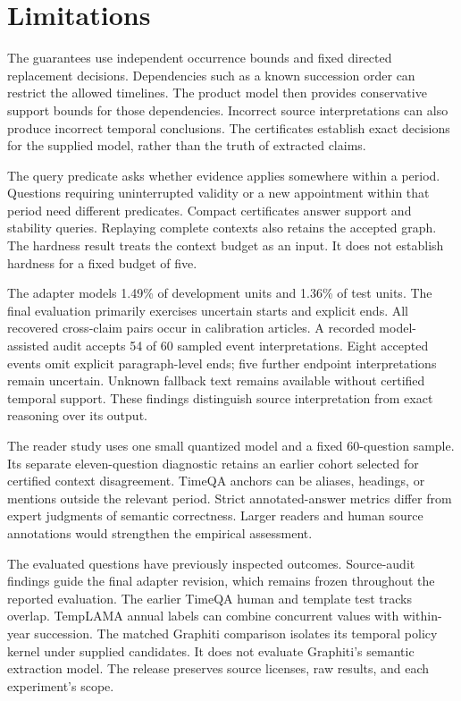 \section*{Limitations}
The guarantees use independent occurrence bounds and fixed directed replacement decisions.
Dependencies such as a known succession order can restrict the allowed timelines.
The product model then provides conservative support bounds for those dependencies.
Incorrect source interpretations can also produce incorrect temporal conclusions.
The certificates establish exact decisions for the supplied model, rather than the truth of extracted claims.

The query predicate asks whether evidence applies somewhere within a period.
Questions requiring uninterrupted validity or a new appointment within that period need different predicates.
Compact certificates answer support and stability queries.
Replaying complete contexts also retains the accepted graph.
The hardness result treats the context budget as an input.
It does not establish hardness for a fixed budget of five.

The adapter models 1.49\% of development units and 1.36\% of test units.
The final evaluation primarily exercises uncertain starts and explicit ends.
All recovered cross-claim pairs occur in calibration articles.
A recorded model-assisted audit accepts 54 of 60 sampled event interpretations.
Eight accepted events omit explicit paragraph-level ends; five further endpoint interpretations remain uncertain.
Unknown fallback text remains available without certified temporal support.
These findings distinguish source interpretation from exact reasoning over its output.

The reader study uses one small quantized model and a fixed 60-question sample.
Its separate eleven-question diagnostic retains an earlier cohort selected for certified context disagreement.
TimeQA anchors can be aliases, headings, or mentions outside the relevant period.
Strict annotated-answer metrics differ from expert judgments of semantic correctness.
Larger readers and human source annotations would strengthen the empirical assessment.

The evaluated questions have previously inspected outcomes.
Source-audit findings guide the final adapter revision, which remains frozen throughout the reported evaluation.
The earlier TimeQA human and template test tracks overlap.
TempLAMA annual labels can combine concurrent values with within-year succession.
The matched Graphiti comparison isolates its temporal policy kernel under supplied candidates.
It does not evaluate Graphiti's semantic extraction model.
The release preserves source licenses, raw results, and each experiment's scope.
